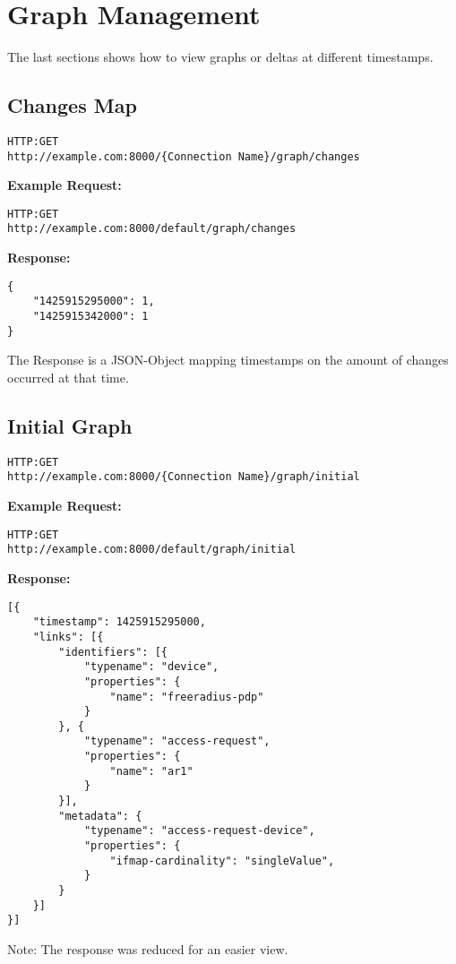 \section{Graph Management}
The last sections shows how to view graphs or deltas at different timestamps.
\subsection{Changes Map}
\begin{lstlisting}
HTTP:GET
http://example.com:8000/{Connection Name}/graph/changes
\end{lstlisting}

\begin{minipage}{\linewidth}
\textbf{Example Request:}
\begin{lstlisting}
HTTP:GET
http://example.com:8000/default/graph/changes
\end{lstlisting}
\end{minipage}

\begin{minipage}{\linewidth}
\textbf{Response:}
\begin{lstlisting}
{
    "1425915295000": 1,
    "1425915342000": 1
}
\end{lstlisting}
\end{minipage}
The Response is a JSON-Object mapping timestamps on the amount of changes occurred at that time.


\subsection{Initial Graph}\label{initial}
\begin{lstlisting}
HTTP:GET
http://example.com:8000/{Connection Name}/graph/initial
\end{lstlisting}

\begin{minipage}{\linewidth}
\textbf{Example Request:}
\begin{lstlisting}
HTTP:GET
http://example.com:8000/default/graph/initial
\end{lstlisting}
\end{minipage}

\begin{minipage}{\linewidth}
\textbf{Response:}
\begin{lstlisting}
[{
    "timestamp": 1425915295000,
    "links": [{
        "identifiers": [{
            "typename": "device",
            "properties": {
                "name": "freeradius-pdp"
            }
        }, {
            "typename": "access-request",
            "properties": {
                "name": "ar1"
            }
        }],
        "metadata": {
            "typename": "access-request-device",
            "properties": { 
                "ifmap-cardinality": "singleValue",
            }
        }
    }]
}]
\end{lstlisting}
Note: The response was reduced for an easier view.
\end{minipage}

